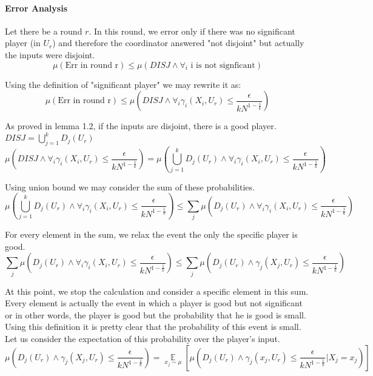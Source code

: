 \paragraph{Error Analysis}
Let there be a round $r$. In this round, we error only if there was no significant player (in $U_r$) and therefore the coordinator answered "not disjoint" but actually the inputs were disjoint.
\begin{equation*}
  \mu(\text{Err in round r}) \leq \mu(DISJ \land \forall_i \text{ i is not signficant})
\end{equation*}

Using the definition of "significant player" we may rewrite it as:
\begin{equation*}
  \mu(\text{Err in round r}) \leq \mu(DISJ \land \forall_i \gamma_i(X_i, U_r) \leq \frac{\epsilon}{kN^{1-\frac{1}{k}}})
\end{equation*}

As proved in lemma 1.2, if the inputs are disjoint, there is a good player. $DISJ = \bigcup_{j = 1}^k D_j(U_r)$ 
\begin{equation*}
  \mu(DISJ \land \forall_i \gamma_i(X_i, U_r) \leq \frac{\epsilon}{kN^{1-\frac{1}{k}}}) = \mu(\bigcup_{j = 1}^k D_j(U_r) \land \forall_i \gamma_i(X_i, U_r) \leq \frac{\epsilon}{kN^{1-\frac{1}{k}}})
\end{equation*}

Using union bound we may consider the sum of these probabilities.
\begin{equation*}
  \mu(\bigcup_{j = 1}^k D_j(U_r) \land \forall_i \gamma_i(X_i, U_r) \leq \frac{\epsilon}{kN^{1-\frac{1}{k}}}) \leq \sum_j \mu(D_j(U_r) \land \forall_i \gamma_i(X_i, U_r) \leq \frac{\epsilon}{kN^{1-\frac{1}{k}}})
\end{equation*}

For every element in the sum, we relax the event the only the specific player is good.
\begin{equation*}
  \sum_j \mu(D_j(U_r) \land \forall_i \gamma_i(X_i, U_r) \leq \frac{\epsilon}{kN^{1-\frac{1}{k}}}) \leq \sum_j \mu(D_j(U_r) \land \gamma_j(X_j, U_r) \leq \frac{\epsilon}{kN^{1-\frac{1}{k}}})
\end{equation*}

At this point, we stop the calculation and consider a specific element in this sum. Every element is actually the event in which a player is good but not significant or in other words, the player is good but the probability that he is good is small. Using this definition it is pretty clear that the probability of this event is small. \newline
Let us consider the expectation of this probability over the player's input.
\begin{equation*}
  \mu(D_j(U_r) \land \gamma_j(X_j, U_r) \leq \frac{\epsilon}{kN^{1-\frac{1}{k}}}) = \underset{x_j \sim \mu}{\mathop{\mathbb{E}}}[\mu(D_j(U_r) \land \gamma_j(x_j, U_r) \leq \frac{\epsilon}{kN^{1-\frac{1}{k}}} | X_j = x_j)]
\end{equation*}

